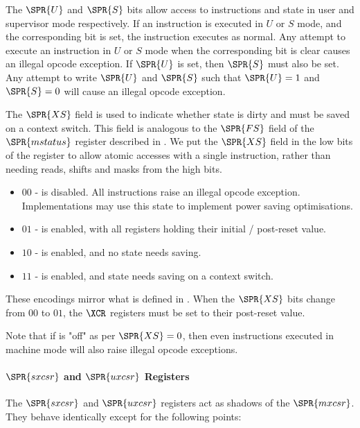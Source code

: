 The $\SPR{U}$ and $\SPR{S}$ bits allow access to \XCID instructions and 
state in user and supervisor mode respectively.
If an \XCID instruction is executed in $U$ or $S$ mode, and the 
corresponding bit is set, the instruction executes as normal.
Any attempt to execute an \XCID instruction in $U$ or $S$ mode when the 
corresponding bit is clear causes an illegal opcode exception.
If $\SPR{U}$ is set, then $\SPR{S}$ must also be set. Any attempt to write
$\SPR{U}$ and $\SPR{S}$
such that $\SPR{U}=1$ and $\SPR{S}=0$ will cause an illegal opcode exception.

The $\SPR{XS}$ field is used to indicate whether \XCID state is dirty and must be saved
on a context switch.
This field is analogous to the $\SPR{FS}$ field of the $\SPR{mstatus}$ register
described in \cite[Section 3.1.6.5]{SCARV:RV:ISA:II:17}.
We put the $\SPR{XS}$ field in the low bits of the register to allow
atomic accesses with a single  instruction, rather than needing
reads, shifts and masks from the high bits.

\begin{itemize}
\item $00$ - \XCID is disabled. All \XCID instructions raise an illegal opcode
    exception.
    Implementations may use this state \XCID to implement power saving 
    optimisations.
\item $01$ - \XCID is enabled, with all \XCID registers holding their initial
    / post-reset value.
\item $10$ - \XCID is enabled, and no state needs saving.
\item $11$ - \XCID is enabled, and state needs saving on a context switch.
\end{itemize}

These encodings mirror what is defined in
\cite[Section 3.1.6.5]{SCARV:RV:ISA:II:17}.
When the $\SPR{XS}$ bits change from $00$ to $01$, the $\XCR$ registers must be
set to their post-reset value.

Note that if \XCID is "off" as per $\SPR{XS}=0$, then even \XCID instructions
executed in machine mode will also raise illegal opcode exceptions.

\paragraph{$\SPR{sxcsr}$ and $\SPR{uxcsr}$ Registers}

The $\SPR{sxcsr}$ and $\SPR{uxcsr}$ registers act as shadows of the 
$\SPR{mxcsr}$. They behave identically except for the following points:

